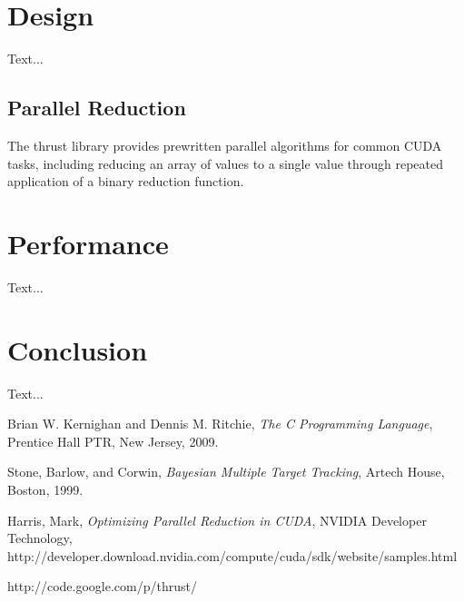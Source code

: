 \documentclass{article}
\begin{document}
\section{Design}
Text...
\subsection{Parallel Reduction}
The thrust library provides prewritten parallel algorithms for common CUDA tasks, including reducing an array of values to a single value through repeated application of a binary reduction function.\cite{thrust}

\section{Performance}
Text...

\section{Conclusion}
Text...

\begin{thebibliography}{9}

  Brian W. Kernighan and Dennis M. Ritchie,
  \emph{The C Programming Language},
  Prentice Hall PTR, New Jersey,
  2009.

  Stone, Barlow, and Corwin,
  \emph{Bayesian Multiple Target Tracking},
  Artech House, Boston,
  1999.

   Harris, Mark,
   \emph{Optimizing Parallel Reduction in CUDA},
   NVIDIA Developer Technology,\\
   http://developer.download.nvidia.com/compute/cuda/sdk/website/samples.html

   http://code.google.com/p/thrust/

\end{thebibliography}
\end{document}
